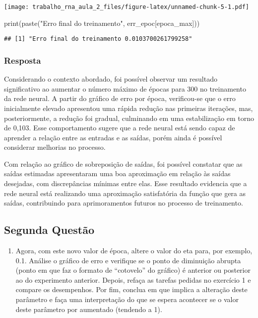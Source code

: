 \documentclass[
]{article}
\newenvironment{Shaded}{\begin{snugshade}}{\end{snugshade}}
\newcommand{\FunctionTok}[1]{\textcolor[rgb]{0.00,0.00,0.00}{#1}}
\newcommand{\NormalTok}[1]{#1}
\newcommand{\StringTok}[1]{\textcolor[rgb]{0.31,0.60,0.02}{#1}}
\providecommand{\tightlist}{%
  \setlength{\itemsep}{0pt}\setlength{\parskip}{0pt}}
\begin{document}
\texttt{[image: trabalho\_rna\_aula\_2\_files/figure-latex/unnamed-chunk-5-1.pdf]}

\begin{Shaded}
\begin{Highlighting}[]
\FunctionTok{print}\NormalTok{(}\FunctionTok{paste}\NormalTok{(}\StringTok{"Erro final do treinamento"}\NormalTok{, err\_epoc[epoca\_max]))}
\end{Highlighting}
\end{Shaded}

\begin{verbatim}
## [1] "Erro final do treinamento 0.0103700261799258"
\end{verbatim}

\hypertarget{resposta}{%
\subsubsection{Resposta}\label{resposta}}

Considerando o contexto abordado, foi possível observar um resultado
significativo ao aumentar o número máximo de épocas para 300 no
treinamento da rede neural. A partir do gráfico de erro por época,
verificou-se que o erro inicialmente elevado apresentou uma rápida
redução nas primeiras iterações, mas, posteriormente, a redução foi
gradual, culminando em uma estabilização em torno de 0,103. Esse
comportamento sugere que a rede neural está sendo capaz de aprender a
relação entre as entradas e as saídas, porém ainda é possível considerar
melhorias no processo.

Com relação ao gráfico de sobreposição de saídas, foi possível constatar
que as saídas estimadas apresentaram uma boa aproximação em relação às
saídas desejadas, com discrepâncias mínimas entre elas. Esse resultado
evidencia que a rede neural está realizando uma aproximação satisfatória
da função que gera as saídas, contribuindo para aprimoramentos futuros
no processo de treinamento.

\hypertarget{segunda-questuxe3o}{%
\subsection{Segunda Questão}\label{segunda-questuxe3o}}

\begin{enumerate}
\def\labelenumi{\arabic{enumi})}
\setcounter{enumi}{1}
\tightlist
\item
  Agora, com este novo valor de época, altere o valor do eta para, por
  exemplo, 0.1. Análise o gráfico de erro e verifique se o ponto de
  diminuição abrupta (ponto em que faz o formato de ``cotovelo'' do
  gráfico) é anterior ou posterior ao do experimento anterior. Depois,
  refaça as tarefas pedidas no exercício 1 e compare os desempenhos. Por
  fim, conclua em que implica a alteração deste parâmetro e faça uma
  interpretação do que se espera acontecer se o valor deste parâmetro
  por aumentado (tendendo a 1).
\end{enumerate}
\end{document}

